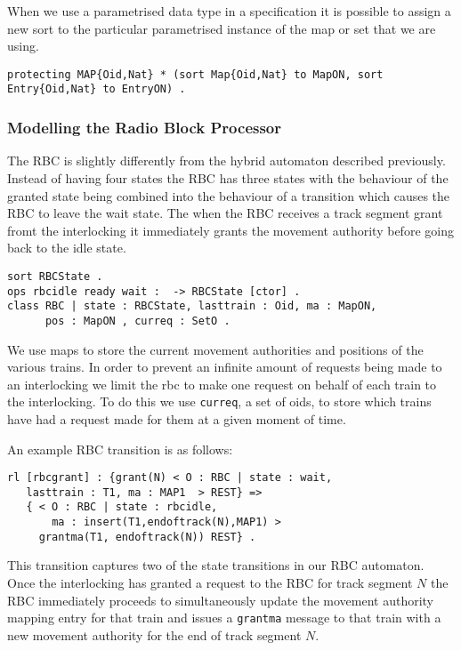 When we use a parametrised data type in a specification it is possible to assign a new sort to the particular parametrised instance of the map or set that we are using.
\begin{center}
\texttt{protecting MAP\{Oid,Nat\}  * (sort Map\{Oid,Nat\} to MapON,
                               sort Entry\{Oid,Nat\} to EntryON) .}
\end{center}




\subsubsection*{Modelling the Radio Block Processor}
The RBC is slightly differently from the hybrid automaton described previously. Instead of having four states the RBC has three states with the behaviour of the granted state being combined into the behaviour of a transition which causes the RBC to leave the wait state. The when the RBC receives a track segment grant fromt the interlocking it immediately grants the movement authority before going back to the idle state.
 
\begin{lstlisting}[caption = The RBC state and class definition in Maude]
sort RBCState .
ops rbcidle ready wait :  -> RBCState [ctor] .
class RBC | state : RBCState, lasttrain : Oid, ma : MapON, 
      pos : MapON , curreq : SetO .
\end{lstlisting}

We use maps to store the current movement authorities and positions of the various trains. In order to prevent an infinite amount of requests being made to an interlocking we limit the rbc to make one request on behalf of each train to the interlocking.  To do this we use  \texttt{curreq}, a set of oids, to store which trains have had a request made for them at a given moment of time.

An example RBC transition is as follows:
\begin{lstlisting}[caption = The state transition for the granting of a movement authority]
rl [rbcgrant] : {grant(N) < O : RBC | state : wait, 
   lasttrain : T1, ma : MAP1  > REST} => 
   { < O : RBC | state : rbcidle, 
       ma : insert(T1,endoftrack(N),MAP1) > 
     grantma(T1, endoftrack(N)) REST} .
\end{lstlisting}

This transition captures two of the state transitions in our RBC automaton. Once the interlocking has granted a request to the RBC for track segment $N$ the RBC immediately proceeds to simultaneously update the movement authority mapping entry for that train and issues a \texttt{grantma} message to that train with a new movement authority for the end of track segment $N$.

